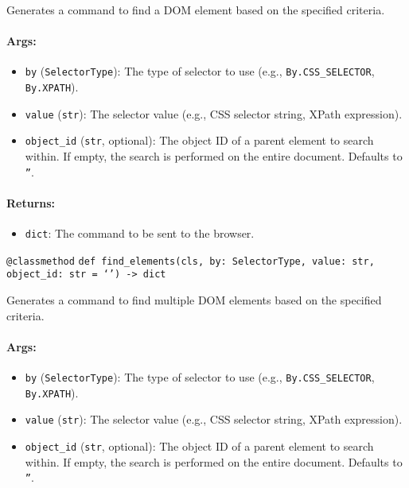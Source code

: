 \documentclass{article}
\begin{document}
\noindent Generates a command to find a DOM element based on the specified criteria.

\paragraph{Args:}
\begin{itemize}
    \item \texttt{by} (\texttt{SelectorType}): The type of selector to use (e.g., \texttt{By.CSS\_SELECTOR}, \texttt{By.XPATH}).
    \item \texttt{value} (\texttt{str}): The selector value (e.g., CSS selector string, XPath expression).
    \item \texttt{object\_id} (\texttt{str}, optional): The object ID of a parent element to search within. If empty, the search is performed on the entire document. Defaults to \texttt{''}.
\end{itemize}

\paragraph{Returns:}
\begin{itemize}
    \item \texttt{dict}: The command to be sent to the browser.
\end{itemize}

\noindent\texttt{@classmethod}
\noindent\texttt{def find\_elements(cls, by: SelectorType, value: str, object\_id: str = `') -> dict}

\noindent Generates a command to find multiple DOM elements based on the specified criteria.

\paragraph{Args:}
\begin{itemize}
    \item \texttt{by} (\texttt{SelectorType}): The type of selector to use (e.g., \texttt{By.CSS\_SELECTOR}, \texttt{By.XPATH}).
    \item \texttt{value} (\texttt{str}): The selector value (e.g., CSS selector string, XPath expression).
    \item \texttt{object\_id} (\texttt{str}, optional): The object ID of a parent element to search within. If empty, the search is performed on the entire document. Defaults to \texttt{''}.
\end{itemize}
\end{document}
